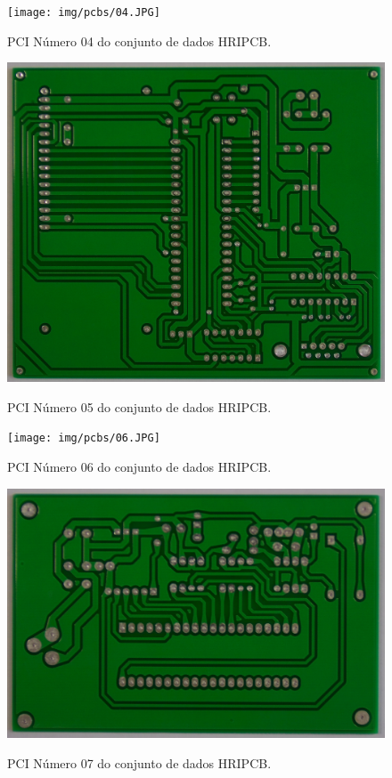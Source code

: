 \begin{figure}[!h] %
  \centering
  \caption{PCI Número 04 do conjunto de dados HRIPCB.}
  \texttt{[image: img/pcbs/04.JPG]}
  \label{fig:ap-pcbs-4}
\end{figure}

\begin{figure}[!h] %
  \centering
  \caption{PCI Número 05 do conjunto de dados HRIPCB.}
  \includegraphics[scale=0.13]{img/pcbs/05.JPG}
  \label{fig:ap-pcbs-5}
\end{figure}

\begin{figure}[!h] %
  \centering
  \caption{PCI Número 06 do conjunto de dados HRIPCB.}
  \texttt{[image: img/pcbs/06.JPG]}
  \label{fig:ap-pcbs-6}
\end{figure}

\begin{figure}[!h] %
  \centering
  \caption{PCI Número 07 do conjunto de dados HRIPCB.}
  \includegraphics[scale=0.13]{img/pcbs/07.JPG}
  \label{fig:ap-pcbs-7}
\end{figure}


